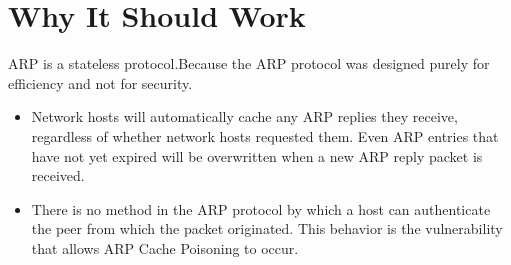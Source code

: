 \documentclass{article}
\begin{document}
 
\section{Why It Should  Work}

ARP is a stateless protocol.Because the ARP protocol was designed purely for efficiency and not for security. 
\renewcommand\labelitemi{$\square$}
\begin{itemize}
    \item 
Network hosts will automatically cache any ARP replies they receive, regardless of whether network hosts requested them. Even ARP entries that have not yet expired will be overwritten when a new ARP reply packet is received.
    \item There is no method in the ARP protocol by which a host can authenticate the peer from which the packet originated. This behavior is the vulnerability that allows ARP Cache Poisoning to occur.
    
\end{itemize}
\end{document}
